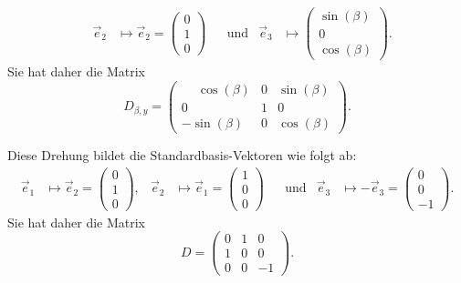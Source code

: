 \begin{loesung}
\begin{teilaufgaben}
\[\begin{aligned}
&
\vec e_2&\mapsto \vec e_2 = \begin{pmatrix}0\\1\\0\end{pmatrix}
&&\text{und}
&
\vec e_3&\mapsto \begin{pmatrix}\sin(\beta)\\0\\\cos(\beta)\end{pmatrix}.
\end{aligned}
\]
Sie hat daher die Matrix
\[
D_{\beta,y}
=
\begin{pmatrix}
\phantom{-}\cos(\beta)&0& \sin(\beta)\\
0&1& 0 \\
-\sin(\beta)&0&\cos(\beta)
\end{pmatrix}.
\]
\item Diese Drehung bildet die Standardbasis-Vektoren wie folgt ab:
\[
\begin{aligned}
\vec e_1&\mapsto \vec e_2 = \begin{pmatrix}0\\1\\0\end{pmatrix},
&
\vec e_2&\mapsto \vec e_1 = \begin{pmatrix}1\\0\\0\end{pmatrix}
&&\text{und}
&
\vec e_3&\mapsto -\vec e_3  = \begin{pmatrix}0\\0\\-1\end{pmatrix}.
\end{aligned}
\]
Sie hat daher die Matrix
\[
D
=
\begin{pmatrix}
0&1& 0\\
1&0& 0\\
0&0&-1
\end{pmatrix}.
\]
\end{teilaufgaben}
\end{loesung}

